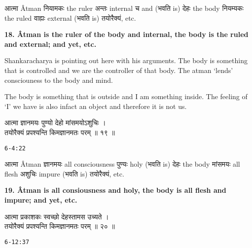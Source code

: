 \documentclass{article}
\begin{document}
\texthindi{आत्मा}
Âtman
\texthindi{नियामकः}
the ruler
\texthindi{अन्तः}
internal
\texthindi{च}
and
(\texthindi{भवति}
is)
\texthindi{देहः}
the body
\texthindi{नियम्यकः}
the ruled
\texthindi{वाह्यः}
external
(\texthindi{भवति}
is)
\texthindi{तयोरैक्यं,}
etc.

\bigskip

\textbf{18.  Âtman is the ruler of the body and internal, the body is the ruled
and external; and yet, etc. }

\begin{oframed}

    Shankaracharya is pointing out here with his arguments. The body is
    something that is controlled and we are the controller of that body. 
    The atman `lends' consciouness to the body and mind.

    The body is something that is outside and I am something inside.  The
    feeling of `I' we have is also infact an object and therefore it is not us.

\end{oframed}

\begin{large}
\begin{center}
    \begin{hindi}
आत्मा ज्ञानमयः पुण्यो देहो मांसमयोऽशुचिः ।\\
तयोरैक्यं प्रपश्यन्ति किमज्ञानमतः परम् ॥ १९ ॥
    \end{hindi}
\end{center}
\end{large}
\texttt{6-4:22}

\texthindi{आत्मा}
Âtman
\texthindi{ज्ञानमयः}
all consciousness
\texthindi{पुण्यः}
holy
(\texthindi{भवति}
is)
\texthindi{देहः}
the body
\texthindi{मांसमयः}
all flesh
\texthindi{अशुचिः}
impure
(\texthindi{भवति}
is)
\texthindi{तयोरैक्यं,}
etc.

\bigskip

\textbf{
    19. Âtman is all consiousness and holy, the body is all flesh and impure;
    and yet, etc.
}


\begin{large}
\begin{center}
    \begin{hindi}
आत्मा प्रकाशकः स्वच्छो देहस्तामस उच्यते ।\\
तयोरैक्यं प्रपश्यन्ति किमज्ञानमतः परम् ॥ २० ॥
    \end{hindi}
\end{center}
\end{large}
\texttt{6-12:37}
\end{document}
